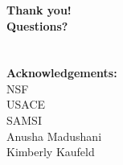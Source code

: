 \documentclass[7pt]{beamer}
\begin{document}
\begin{frame}
	\frametitle{}
		\hspace{2.5cm}
		\begin{minipage}{50mm}   
                 	\begin{alertblock}{}    
                        		 \begin{center}
                  			\textbf{Thank you! \\Questions?}\\
					$\,$\\
					$\,$\\
				\textbf{Acknowledgements:}\\
					NSF\\
					USACE\\
					SAMSI\\
					Anusha Madushani\\
					Kimberly Kaufeld
				\end{center}
      			\end{alertblock}
		\end{minipage}
\end{frame}

\end{document}

